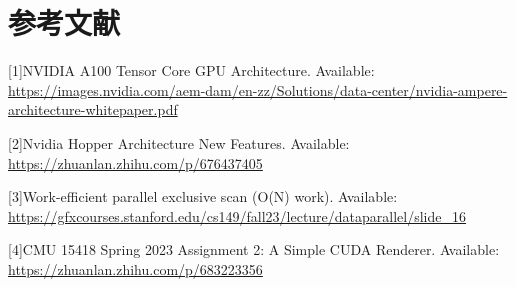 \documentclass[zihao=-4]{ctexart}
\begin{document}
\newpage

\section*{参考文献} %
\hypersetup{urlcolor=black}
[1]NVIDIA A100 Tensor Core GPU Architecture. Available: \url{https://images.nvidia.com/aem-dam/en-zz/Solutions/data-center/nvidia-ampere-architecture-whitepaper.pdf}

[2]Nvidia Hopper Architecture New Features. Available: \url{https://zhuanlan.zhihu.com/p/676437405}

[3]Work-efficient parallel exclusive scan (O(N) work). Available: \url{https://gfxcourses.stanford.edu/cs149/fall23/lecture/dataparallel/slide_16}

[4]CMU 15418 Spring 2023 Assignment 2: A Simple CUDA Renderer. Available: \url{https://zhuanlan.zhihu.com/p/683223356}

% 
\end{document}
